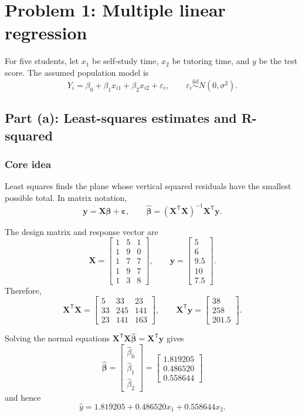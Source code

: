 ﻿\documentclass[11pt]{article}
\begin{document}
\section{Problem 1: Multiple linear regression}

For five students, let $x_1$ be self-study time, $x_2$ be tutoring time,
and $y$ be the test score. The assumed population model is
\[
  Y_i=\beta_0+\beta_1x_{i1}+\beta_2x_{i2}+\varepsilon_i,
  \qquad \varepsilon_i\overset{\mathrm{iid}}{\sim}N(0,\sigma^2).
\]

\subsection{Part (a): Least-squares estimates and R-squared}

\subsubsection*{Core idea}

Least squares finds the plane whose vertical squared residuals have the
smallest possible total. In matrix notation,
\[
  \bm y=\bm X\bm\beta+\bm\varepsilon,
  \qquad
  \widehat{\bm\beta}=(\bm X^{\mathsf T}\bm X)^{-1}
  \bm X^{\mathsf T}\bm y.
\]

The design matrix and response vector are
\[
\bm X=
\begin{bmatrix}
1&5&1\\
1&9&0\\
1&7&7\\
1&9&7\\
1&3&8
\end{bmatrix},
\qquad
\bm y=
\begin{bmatrix}
5\\6\\9.5\\10\\7.5
\end{bmatrix}.
\]
Therefore,
\[
\bm X^{\mathsf T}\bm X=
\begin{bmatrix}
5&33&23\\
33&245&141\\
23&141&163
\end{bmatrix},
\qquad
\bm X^{\mathsf T}\bm y=
\begin{bmatrix}
38\\258\\201.5
\end{bmatrix}.
\]

Solving the normal equations
$\bm X^{\mathsf T}\bm X\widehat{\bm\beta}
=\bm X^{\mathsf T}\bm y$ gives
\[
\boxed{
\widehat{\bm\beta}=
\begin{bmatrix}
\widehat\beta_0\\[2pt]\widehat\beta_1\\[2pt]\widehat\beta_2
\end{bmatrix}
=
\begin{bmatrix}
1.819205\\0.486520\\0.558644
\end{bmatrix}}
\]
and hence
\[
  \boxed{\widehat y=1.819205+0.486520x_1+0.558644x_2.}
\]
\end{document}
